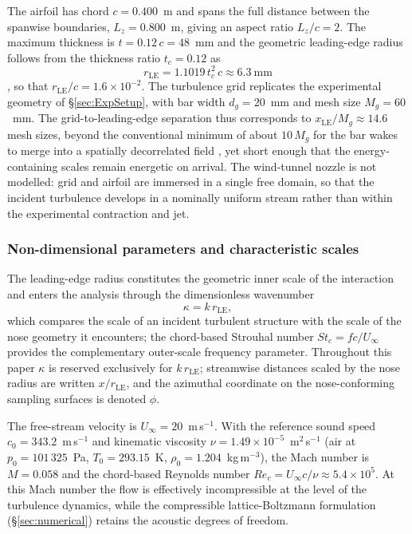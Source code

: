 \documentclass[lineno]{JFM-FLM_Au}
\begin{document}
The airfoil has chord $c = 0.400$~m and spans the full distance
between the spanwise boundaries, $L_z = 0.800$~m, giving an aspect
ratio $L_z/c = 2$. The maximum thickness is $t = 0.12\,c = 48$~mm and
the geometric leading-edge radius follows from the thickness ratio
$t_c = 0.12$ as
\begin{equation}
  r_{\mathrm{LE}} = 1.1019\,t_c^{2}\,c \approx 6.3~\mathrm{mm}
  \label{eq:rLE_def}
\end{equation}
\citep{AbbottDoenhoff1959}, so that
$r_{\mathrm{LE}}/c = 1.6\times10^{-2}$. The turbulence grid replicates
the experimental geometry of \S\ref{sec:ExpSetup}, with bar width
$d_g = 20$~mm and mesh size $M_g = 60$~mm.
The grid-to-leading-edge separation thus corresponds to
$x_{\mathrm{LE}}/M_g \approx 14.6$ mesh sizes, beyond the conventional
minimum of about $10\,M_g$ for the bar wakes to merge into a
spatially decorrelated field \citep{Roach1987,ComteBellotCorrsin1971},
yet short enough that the energy-containing scales remain energetic
on arrival. The wind-tunnel nozzle is not modelled: grid and airfoil
are immersed in a single free domain, so that the incident turbulence
develops in a nominally uniform stream rather than within the
experimental contraction and jet.

\subsubsection{Non-dimensional parameters and characteristic scales}

The leading-edge radius constitutes the geometric inner scale of the
interaction and enters the analysis through the dimensionless
wavenumber
\begin{equation}
  \kappa = k\,r_{\mathrm{LE}},
  \label{eq:kappa_def}
\end{equation}
which compares the scale of an incident turbulent structure with the
scale of the nose geometry it encounters; the chord-based Strouhal
number $St_c = fc/U_{\infty}$ provides the complementary outer-scale
frequency parameter. Throughout this paper $\kappa$ is reserved
exclusively for $k\,r_{\mathrm{LE}}$; streamwise distances scaled by
the nose radius are written $x/r_{\mathrm{LE}}$, and the azimuthal
coordinate on the nose-conforming sampling surfaces is denoted
$\phi$.

The free-stream velocity is $U_{\infty} = 20$~m\,s$^{-1}$. With the
reference sound speed $c_0 = 343.2$~m\,s$^{-1}$ and kinematic
viscosity $\nu = 1.49\times10^{-5}$~m$^2$\,s$^{-1}$ (air at
$p_0 = 101\,325$~Pa, $T_0 = 293.15$~K, $\rho_0 = 1.204$~kg\,m$^{-3}$),
the Mach number is $M = 0.058$ and the chord-based Reynolds number
$Re_c = U_{\infty}c/\nu \approx 5.4\times10^{5}$.
At this Mach number the flow is effectively incompressible at the
level of the turbulence dynamics, while the compressible
lattice-Boltzmann formulation (\S\ref{sec:numerical}) retains the
acoustic degrees of freedom.
\end{document}
